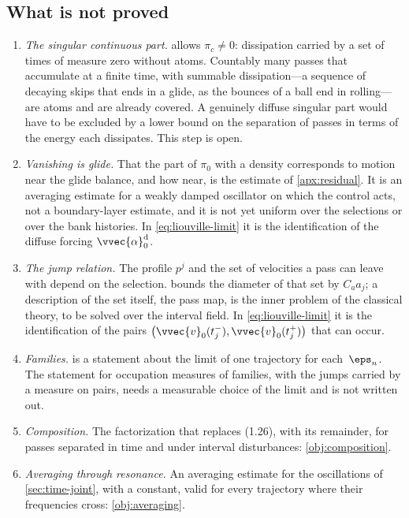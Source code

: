 \subsection{What is not proved}\label{sec:time-open}

\begin{enumerate}[leftmargin=*,itemsep=3pt]
  \item \emph{The singular continuous part.}  allows
    $\pi_c\ne 0$: dissipation carried by a set of times of measure zero
    without atoms. Countably many passes that accumulate at a finite time,
    with summable dissipation---a sequence of decaying skips that ends in a
    glide, as the bounces of a ball end in rolling---are atoms and are
    already covered. A genuinely diffuse singular part would have to be
    excluded by a lower bound on the separation of passes in terms of the
    energy each dissipates. This step is open.
  \item \emph{Vanishing is glide.} That the part of $\pi_0$ with a density
    corresponds to motion near the glide balance, and how near, is the
    estimate of \cref{apx:residual}. It is an averaging estimate for a
    weakly damped oscillator on which the control acts, not a
    boundary-layer estimate, and it is not yet uniform over the selections
    or over the bank histories. In \cref{eq:liouville-limit} it is the
    identification of the diffuse forcing $\vvec{\alpha}_0^{\mathrm{d}}$.
  \item \emph{The jump relation.} The profile $p^j$ and the set of
    velocities a pass can leave with depend on the selection.
     bounds the diameter of that set by $C_a a_j$; a
    description of the set itself, the pass map, is the inner problem of
    the classical theory, to be solved over the interval field. In
    \cref{eq:liouville-limit} it is the identification of the pairs
    $\bigl(\vvec{v}_0(t_j^-),\vvec{v}_0(t_j^+)\bigr)$ that can occur.
  \item \emph{Families.}  is a statement about the
    limit of one trajectory for each~$\eps_n$. The statement for
    occupation measures of families, with the jumps carried by a measure
    on pairs, needs a measurable choice of the limit and is not written
    out.
  \item \emph{Composition.} The factorization that replaces (1.26), with
    its remainder, for passes separated in time and under interval
    disturbances: \cref{obj:composition}.
  \item \emph{Averaging through resonance.} An averaging estimate for the
    oscillations of \cref{sec:time-joint}, with a constant, valid for every
    trajectory where their frequencies cross: \cref{obj:averaging}.
\end{enumerate}
